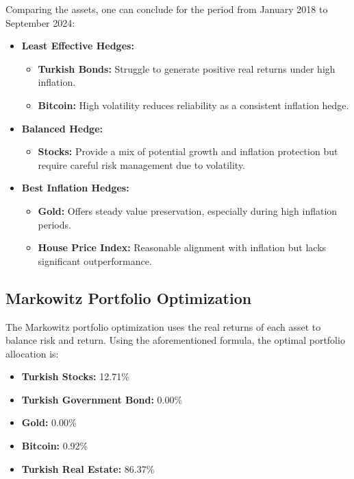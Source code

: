 \documentclass[
]{article}
\begin{document}
Comparing the assets, one can conclude for the period from January 2018 to September 2024: 

\begin{itemize}
    \item \textbf{Least Effective Hedges:}
    \begin{itemize}
        \item \textbf{Turkish Bonds:} Struggle to generate positive real returns under high inflation.
        \item \textbf{Bitcoin:} High volatility reduces reliability as a consistent inflation hedge.
    \end{itemize}
    
    \item \textbf{Balanced Hedge:}
    \begin{itemize}
        \item \textbf{Stocks:} Provide a mix of potential growth and inflation protection but require careful risk management due to volatility.
    \end{itemize}
    
    \item \textbf{Best Inflation Hedges:}
    \begin{itemize}
        \item \textbf{Gold:} Offers steady value preservation, especially during high inflation periods.
        \item \textbf{House Price Index:} Reasonable alignment with inflation but lacks significant outperformance.
    \end{itemize}
\end{itemize}

\subsection{Markowitz Portfolio Optimization}

The Markowitz portfolio optimization uses the real returns of each asset to balance risk and return. Using the aforementioned formula, the optimal portfolio allocation is:

\begin{itemize}
  \item \textbf{Turkish Stocks:} 12.71\%
  \item \textbf{Turkish Government Bond:} 0.00\%
  \item \textbf{Gold:} 0.00\%
  \item \textbf{Bitcoin:} 0.92\%
  \item \textbf{Turkish Real Estate:} 86.37\%
\end{itemize}
\end{document}
